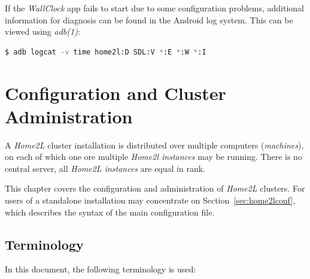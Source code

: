 \documentclass[12pt,english,parskip=half,headheight=19pt]{scrreprt}
\begin{document}
If the \textit{WallClock} app fails to start due to some configuration problems,
additional information for diagnosis can be found in the Android log system.
This can be viewed using \textit{adb(1)}:
\begin{lstlisting}[language=bash]
  $ adb logcat -v time home2l:D SDL:V *:E *:W *:I
\end{lstlisting}






\chapter{Configuration and Cluster Administration}
\label{ch:managing}


A \textit{Home2L} cluster installation is distributed over multiple computers (\textit{machines}), on each of which one ore multiple \textit{Home2l instances} may be running. There is no central server, all \textit{Home2L instances} are equal in rank.

This chapter covers the configuration and administration of \textit{Home2L} clusters. For users of a standalone installation may concentrate on Section~\ref{sec:home2lconf}, which describes the syntax of the main configuration file.



\section{Terminology}
\label{sec:managing-terminology}


In this document, the following terminology is used:
\end{document}
